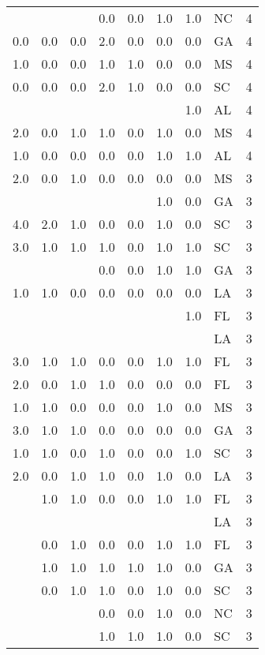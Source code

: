 \begin{tabular}{llllllllr}
    &     &     & 0.0 & 0.0 & 1.0 & 1.0 & NC &     4 \\
0.0 & 0.0 & 0.0 & 2.0 & 0.0 & 0.0 & 0.0 & GA &     4 \\
1.0 & 0.0 & 0.0 & 1.0 & 1.0 & 0.0 & 0.0 & MS &     4 \\
0.0 & 0.0 & 0.0 & 2.0 & 1.0 & 0.0 & 0.0 & SC &     4 \\
    &     &     &     &     &     & 1.0 & AL &     4 \\
2.0 & 0.0 & 1.0 & 1.0 & 0.0 & 1.0 & 0.0 & MS &     4 \\
1.0 & 0.0 & 0.0 & 0.0 & 0.0 & 1.0 & 1.0 & AL &     4 \\
2.0 & 0.0 & 1.0 & 0.0 & 0.0 & 0.0 & 0.0 & MS &     3 \\
    &     &     &     &     & 1.0 & 0.0 & GA &     3 \\
4.0 & 2.0 & 1.0 & 0.0 & 0.0 & 1.0 & 0.0 & SC &     3 \\
3.0 & 1.0 & 1.0 & 1.0 & 0.0 & 1.0 & 1.0 & SC &     3 \\
    &     &     & 0.0 & 0.0 & 1.0 & 1.0 & GA &     3 \\
1.0 & 1.0 & 0.0 & 0.0 & 0.0 & 0.0 & 0.0 & LA &     3 \\
    &     &     &     &     &     & 1.0 & FL &     3 \\
    &     &     &     &     &     &     & LA &     3 \\
3.0 & 1.0 & 1.0 & 0.0 & 0.0 & 1.0 & 1.0 & FL &     3 \\
2.0 & 0.0 & 1.0 & 1.0 & 0.0 & 0.0 & 0.0 & FL &     3 \\
1.0 & 1.0 & 0.0 & 0.0 & 0.0 & 1.0 & 0.0 & MS &     3 \\
3.0 & 1.0 & 1.0 & 0.0 & 0.0 & 0.0 & 0.0 & GA &     3 \\
1.0 & 1.0 & 0.0 & 1.0 & 0.0 & 0.0 & 1.0 & SC &     3 \\
2.0 & 0.0 & 1.0 & 1.0 & 0.0 & 1.0 & 0.0 & LA &     3 \\
    & 1.0 & 1.0 & 0.0 & 0.0 & 1.0 & 1.0 & FL &     3 \\
    &     &     &     &     &     &     & LA &     3 \\
    & 0.0 & 1.0 & 0.0 & 0.0 & 1.0 & 1.0 & FL &     3 \\
    & 1.0 & 1.0 & 1.0 & 1.0 & 1.0 & 0.0 & GA &     3 \\
    & 0.0 & 1.0 & 1.0 & 0.0 & 1.0 & 0.0 & SC &     3 \\
    &     &     & 0.0 & 0.0 & 1.0 & 0.0 & NC &     3 \\
    &     &     & 1.0 & 1.0 & 1.0 & 0.0 & SC &     3 \\

\end{tabular}
